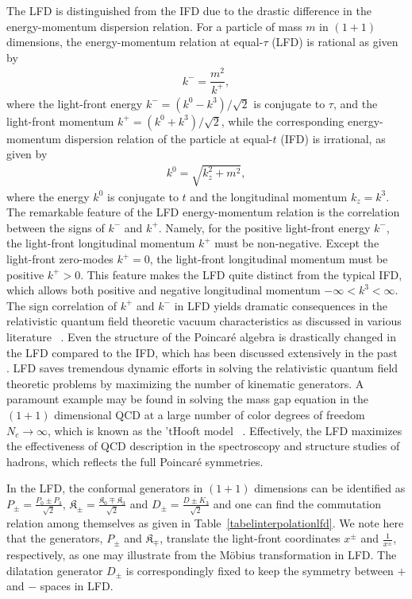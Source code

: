 \documentclass[%
 reprint,
superscriptaddress,
 amsmath,amssymb,
 aps,
]{revtex4-2}
\begin{document}
The LFD is distinguished from the IFD due to the drastic difference in the energy-momentum dispersion relation. For a particle of mass $m$ in $(1+1)$ dimensions, the energy-momentum relation at equal-$\tau$ (LFD) is rational as given by
\begin{align}
  k^{-}=\dfrac{m^{2}}{k^{+}}, \label{eqn:E-P_relation_LF}
\end{align}
where the light-front energy $k^{-}=(k^{0}-k^{3})/\sqrt{2}$ is conjugate to $\tau$, and the light-front momentum $k^{+}=(k^{0}+k^{3})/\sqrt{2}$,
while the corresponding energy-momentum dispersion relation of the particle at equal-$t$ (IFD) is irrational, as given by
\begin{align}
  k^{0}=\sqrt{k_z^{2}+m^{2}}, \label{eqn:E-P_relation_IF}
\end{align}
where the energy $k^{0}$ is conjugate to $t$ and the longitudinal momentum $k_z = k^{3}$. 
The remarkable feature of the LFD energy-momentum relation is the correlation between the signs of $k^{-}$ and $k^{+}$. Namely, for the positive light-front energy $k^{-}$, the light-front longitudinal momentum $k^{+}$ must be non-negative.
Except the light-front zero-modes $k^{+}=0$, the light-front longitudinal momentum must be positive $k^{+}>0$. This feature makes the LFD quite distinct from the typical IFD, which allows both positive and negative longitudinal momentum $-\infty < k^3 < \infty$. The sign correlation of $k^+$ and $k^-$ in LFD yields dramatic consequences in the relativistic quantum field theoretic vacuum characteristics as discussed in various literature~ \cite{Brodsky_1998, BrodskyLightFrontMethodsandNonPerturbativeQCD, harindranath1998introductionlightfrontdynamicspedestrians, ji2023relativistic}. 
Even the structure of the Poincar\'e algebra is drastically changed in the LFD compared to the IFD, which has been discussed extensively in the past~ \cite{Ji2001}.
LFD saves tremendous dynamic efforts in solving the relativistic quantum field theoretic problems by maximizing the number of kinematic generators. 
A paramount example may be found in solving the mass gap equation in the $(1+1)$ dimensional QCD at a large number of color degrees of freedom $N_c \to \infty$, which is known as the 'tHooft model~ \cite{THOOFT1974461, Ji2021QCD, ji2023relativistic}. Effectively, the LFD maximizes the effectiveness of QCD description in the spectroscopy and structure studies of hadrons, which reflects the full Poincar\'e symmetries.

In the LFD, the conformal generators in $(1+1)$ dimensions can be identified as 
$P_{\pm}=\frac{P_{0}\pm P_{3}}{\sqrt{2}}$, $\mathfrak{K}_{\pm}=\frac{\mathfrak{K}_{0}\mp \mathfrak{K}_{3}}{\sqrt{2}}$ and $D_{\pm}=\frac{D\pm{K_{3}}}{\sqrt{2}}$ and one can find the commutation relation among themselves 
as given in Table~\ref{tabelinterpolationlfd}. 
We note here that the generators, $P_{\pm}$ and $\mathfrak{K}_{\mp} $, translate the light-front coordinates $x^{\pm}$ and $\frac{1}{x^{\pm}}$, respectively, as one may illustrate from the M\"{o}bius transformation in LFD. The dilatation generator $D_{\pm}$ is correspondingly fixed to keep the symmetry between $+$ and $-$ spaces in LFD.
\end{document}
